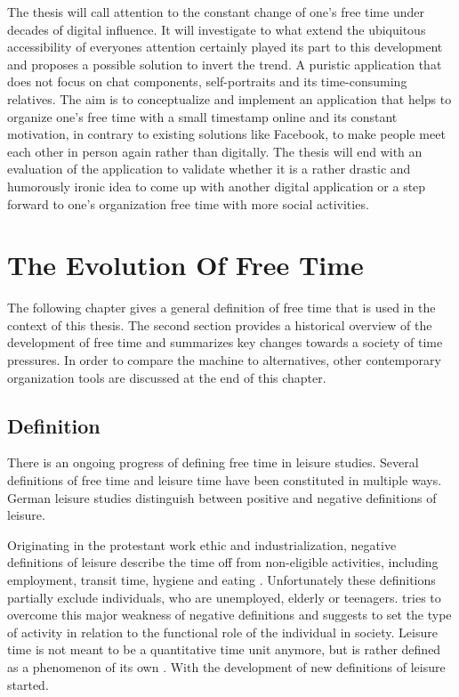 \documentclass[12pt,numbers=noenddot,parskip,bibliography=totocnumbered,listof=totocnumbered,draft]{scrreprt}
\begin{document}
The thesis will call attention to the constant change of one's free time under decades of digital influence. It will investigate to what extend the ubiquitous accessibility of everyones attention certainly played its part to this development and proposes a possible solution to invert the trend. A puristic application that does not focus on chat components, self-portraits and its time-consuming relatives. The aim is to conceptualize and implement an application that helps to organize one's free time with a small timestamp online and its constant motivation, in contrary to existing solutions like Facebook, to make people meet each other in person again rather than digitally. The thesis will end with an evaluation of the application to validate whether it is a rather drastic and humorously ironic idea to come up with another digital application or a step forward to one's organization free time with more social activities.

\chapter{The Evolution Of Free Time}

The following chapter gives a general definition of free time that is used in the context of this thesis. The second section provides a historical overview of the development of free time and summarizes key changes towards a society of time pressures. In order to compare the machine to alternatives, other contemporary organization tools are discussed at the end of this chapter.

\section{Definition}

There is an ongoing progress of defining free time in leisure studies. Several definitions of free time and leisure time have been constituted in multiple ways. German leisure studies distinguish between positive and negative definitions of leisure. 

Originating in the protestant work ethic \citep[p.27]{weber2006} and industrialization, negative definitions of leisure describe the time off from non-eligible activities, including employment, transit time, hygiene and eating \citep[p.137]{prahl2002}. Unfortunately these definitions partially exclude individuals, who are unemployed, elderly or teenagers. \citeauthor{scheuch1972} tries to overcome this major weakness of negative definitions and suggests to set the type of activity in relation to the functional role of the individual in society. Leisure time is not meant to be a quantitative time unit anymore, but is rather defined as a phenomenon of its own \citep[p.31]{scheuch1972}. With \citeauthor{scheuch1972} the development of new definitions of leisure started.
\end{document}
